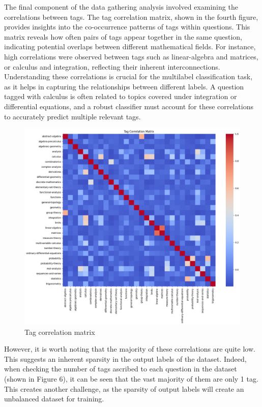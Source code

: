 \documentclass[12pt, letterpaper]{article}
\begin{document}
\par The final component of the data gathering analysis involved examining the correlations between tags. The tag correlation matrix, shown in the fourth figure, provides insights into the co-occurrence patterns of tags within questions. This matrix reveals how often pairs of tags appear together in the same question, indicating potential overlaps between different mathematical fields. For instance, high correlations were observed between tags such as linear-algebra and matrices, or calculus and integration, reflecting their inherent interconnections. Understanding these correlations is crucial for the multilabel classification task, as it helps in capturing the relationships between different labels. A question tagged with calculus is often related to topics covered under integration or differential equations, and a robust classifier must account for these correlations to accurately predict multiple relevant tags.
\begin{figure}[H]
\centering
\includegraphics[scale=0.5]{../figs/exploratory_analysis/tag_corr_mat}
\caption{Tag correlation matrix}
\end{figure}
However, it is worth noting that the majority of these correlations are quite low. This suggests an inherent sparsity in the output labels of the dataset. Indeed, when checking the number of tags ascribed to each question in the dataset (shown in Figure 6), it can be seen that the vast majority of them are only 1 tag. This creates another challenge, as the sparsity of output labels will create an unbalanced dataset for training.
\end{document}
